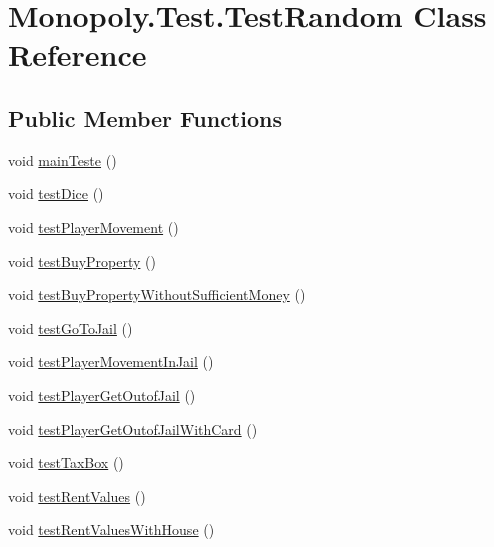 \hypertarget{class_monopoly_1_1_test_1_1_test_random}{}\section{Monopoly.\+Test.\+Test\+Random Class Reference}
\label{class_monopoly_1_1_test_1_1_test_random}
\subsection*{Public Member Functions}
\begin{DoxyCompactItemize}
\item 
void \hyperlink{class_monopoly_1_1_test_1_1_test_random_a420820757cb6dd6dfbd446c58b0fbd72}{main\+Teste} ()
\item 
void \hyperlink{class_monopoly_1_1_test_1_1_test_random_ac8fc6c23c36bb1e5c20bc0aa3642b15f}{test\+Dice} ()
\item 
void \hyperlink{class_monopoly_1_1_test_1_1_test_random_ac36028b596ecdfaeab5a282b8d15979e}{test\+Player\+Movement} ()
\item 
void \hyperlink{class_monopoly_1_1_test_1_1_test_random_a6b7332f7b3cfd2e633ad2843b700bd67}{test\+Buy\+Property} ()
\item 
void \hyperlink{class_monopoly_1_1_test_1_1_test_random_aa77b07af461c4b929d164795175bdc8c}{test\+Buy\+Property\+Without\+Sufficient\+Money} ()
\item 
void \hyperlink{class_monopoly_1_1_test_1_1_test_random_a4e3d2575b5c6210c7873b3f1c7788f7f}{test\+Go\+To\+Jail} ()
\item 
void \hyperlink{class_monopoly_1_1_test_1_1_test_random_a702d01dd849c45476acdd846132b8313}{test\+Player\+Movement\+In\+Jail} ()
\item 
void \hyperlink{class_monopoly_1_1_test_1_1_test_random_aa4b999c2b1577435a40d13e8ce18c51a}{test\+Player\+Get\+Outof\+Jail} ()
\item 
void \hyperlink{class_monopoly_1_1_test_1_1_test_random_a405c0c46378ce375dc31c3d8997d930f}{test\+Player\+Get\+Outof\+Jail\+With\+Card} ()
\item 
void \hyperlink{class_monopoly_1_1_test_1_1_test_random_a3b2f220dee8b4e78477b9b3032e1ac2d}{test\+Tax\+Box} ()
\item 
void \hyperlink{class_monopoly_1_1_test_1_1_test_random_a1225a1ac4612b6c016ce5302d18d6446}{test\+Rent\+Values} ()
\item 
void \hyperlink{class_monopoly_1_1_test_1_1_test_random_af81e2c978d1877b9833f4b28cb91f344}{test\+Rent\+Values\+With\+House} ()

\end{DoxyCompactItemize}
